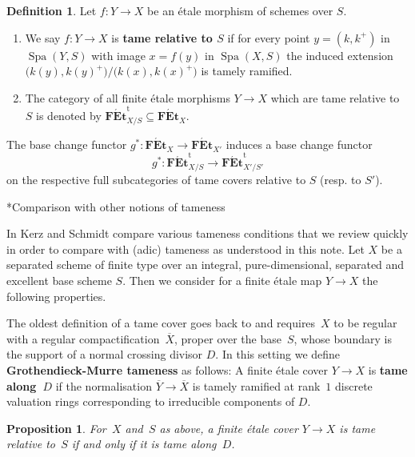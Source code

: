 \documentclass[a4paper,twoside,11pt,reqno]{amsart}
\makeatletter
\newcommand{\la}{\longrightarrow}
\DeclareMathOperator{\Spa}{Spa}
\newcommand{\cat}[1]{\mathbf{#1}}
\newcommand{\FEt}{\cat{F\acute{E}t}}
\newcommand{\ov}[1]{\overline{#1}}
\newcommand{\FEtt}{{\cat{F\acute{E}t}}^{\!\mathrm{t}}}
\def\subsubsection{\@startsection{subsubsection}{3}%
      \z@{.5\linespacing\@plus.7\linespacing}{-.5em}%
      {\normalfont\bfseries}}
\newtheorem{prop}[thm]{Proposition}
\theoremstyle{definition}
\newtheorem{defi}[thm]{Definition}
\numberwithin{equation}{subsection}
\makeatother
\begin{document}
\begin{defi}
\label{defi:tame cover of schemes X over S}
    Let $f\colon Y \to X$ be an \'etale morphism of schemes over $S$.   
    \begin{enumerate}
        \item 
        We say $f\colon Y \to X$ is \textbf{tame relative to $S$} if for every point $y = (k,k^+)$ in $\Spa(Y, S)$ with image $x = f(y)$ in $\Spa(X, S)$ the induced extension
        $
            \big(k(y),k(y)^+\big) / \big(k(x), k(x)^+\big)
        $
        is tamely ramified.
        \item 
        The category of all finite \'etale morphisms $Y\to X$ which are tame relative to $S$ is denoted by $\FEtt_{X/S}\subseteq \FEt_X$. 
    \end{enumerate}
\end{defi}

The base change functor $g^\ast \colon \FEt_X \to \FEt_{X'}$ induces a base change functor
\[
    g^\ast \colon \FEtt_{X/S} \la \FEtt_{X'/S'}
\]
on the respective full subcategories of tame covers relative to $S$ (resp. to $S'$).


\subsubsection*{Comparison with other notions of tameness}

In \cite{KerzSchmidt2010:DifferentNotionsTameness} Kerz and Schmidt compare various tameness conditions that we review quickly in order to compare with (adic) tameness as understood in this note. 
Let $X$ be a separated scheme of finite type over an integral, pure-dimensional, separated and excellent base scheme $S$.
Then we consider for a finite \'etale map $Y \to X$ the following properties. 

The oldest definition of a tame cover goes back to \cite[Exposé~X]{SGA1} and requires~$X$ to be regular with a regular compactification~$\ov X$, proper over the base~$S$, whose boundary is the support of a normal crossing divisor $D$.
In this setting we define \textbf{Grothendieck-Murre tameness} as follows:
A finite étale cover $Y \to X$ is \textbf{tame along~$D$} if the normalisation $\ov{Y} \to \ov{X}$ is tamely ramified at rank~$1$ discrete valuation rings corresponding to irreducible components of $D$.

\begin{prop}
    For~$X$ and~$S$ as above, a finite étale cover $Y \to X$ is tame relative to~$S$ if and only if it is tame along~$D$.
\end{prop}
\end{document}
